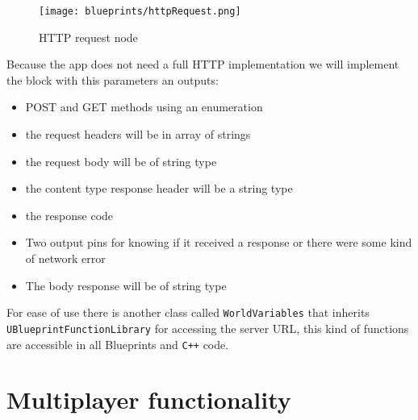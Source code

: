 \begin{figure}[h]
    \centering
    \texttt{[image: blueprints/httpRequest.png]}
    \caption{HTTP request node}
    \label{fig:HTTPrequest}
\end{figure}
\noindent
Because the app does not need a full \ac{HTTP} implementation we will implement the block with this parameters an outputs:
\begin{itemize}
    \item POST and GET methods using an enumeration
    \item the request headers will be in array of strings
    \item the request body will be of string type
    \item the content type response header will be a string type
    \item the response code
    \item Two output pins for knowing if it received a response or there were some kind of network error
    \item The body response will be of string type
\end{itemize}
\noindent
For ease of use there is another class called \texttt{WorldVariables} that inherits \linebreak\texttt{UBlueprintFunctionLibrary} for accessing the server \ac{URL}, this kind of functions are accessible in all Blueprints and \texttt{C++} code.


\section{Multiplayer functionality}
\noindent
